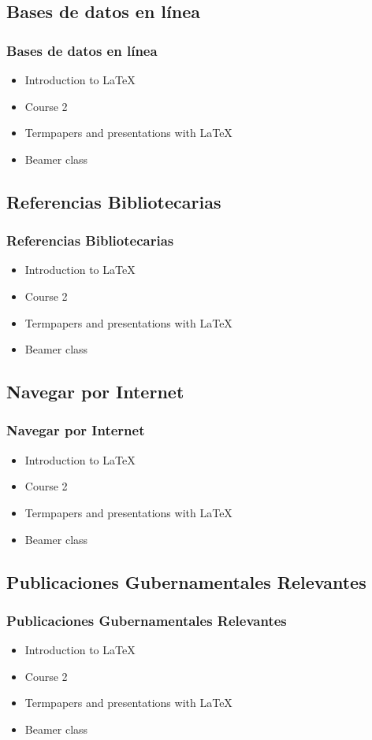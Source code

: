 \documentclass{beamer}
\begin{document}
\subsection{Bases de datos en l\'inea}
\begin{frame}\frametitle{Bases de datos en l\'inea}
\begin{itemize}
\item Introduction to  \LaTeX  
\item Course 2 
\item Termpapers and presentations with \LaTeX 
\item Beamer class
\end{itemize} 
\end{frame}

\subsection{Referencias Bibliotecarias}
\begin{frame}\frametitle{Referencias Bibliotecarias}
\begin{itemize}
\item Introduction to  \LaTeX  
\item Course 2 
\item Termpapers and presentations with \LaTeX 
\item Beamer class
\end{itemize} 
\end{frame}

\subsection{Navegar por Internet}
\begin{frame}\frametitle{Navegar por Internet}
\begin{itemize}
\item Introduction to  \LaTeX  
\item Course 2 
\item Termpapers and presentations with \LaTeX 
\item Beamer class
\end{itemize} 
\end{frame}

\subsection{Publicaciones Gubernamentales Relevantes}
\begin{frame}\frametitle{Publicaciones Gubernamentales Relevantes}
\begin{itemize}
\item Introduction to  \LaTeX  
\item Course 2 
\item Termpapers and presentations with \LaTeX 
\item Beamer class
\end{itemize} 
\end{frame}
\end{document}
